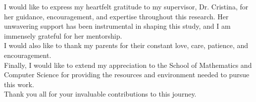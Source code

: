 I would like to express my heartfelt gratitude to my supervisor, Dr. Cristina, for her guidance, encouragement, and expertise throughout this research. Her unwavering support has been instrumental in shaping this study, and I am immensely grateful for her mentorship. \\

\noindent I would also like to thank my parents for their constant love, care, patience, and encouragement. \\

\noindent Finally, I would like to extend my appreciation to the School of Mathematics and Computer Science for providing the resources and environment needed to pursue this work. \\


\noindent Thank you all for your invaluable contributions to this journey.
